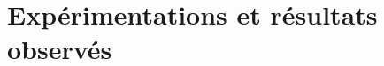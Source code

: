 \label{ExpRO}\chapter{Expérimentations et résultats observés}
    \section{}
        \subsection{}
            \subsubsection{}